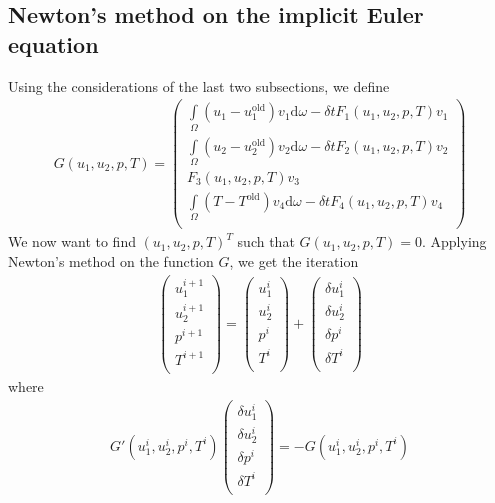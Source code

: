 \documentclass{article}
\begin{document}
 \subsection{Newton's method on the implicit Euler equation}
 Using the considerations of the last two subsections, we define
 \begin{align*}
 G(u_1,u_2,p,T) = 
 \begin{pmatrix}
\int\limits_\Omega (u_1- u_1^\text{old})v_1 \text{d}\omega -\delta t F_1(u_1,u_2,p,T)v_1\\
\int\limits_\Omega (u_2- u_2^\text{old})v_2 \text{d}\omega -\delta t F_2(u_1,u_2,p,T)v_2\\
F_3(u_1,u_2,p,T)v_3\\
\int\limits_\Omega (T- T^\text{old})v_4 \text{d}\omega -\delta t F_4(u_1,u_2,p,T)v_4\\
 \end{pmatrix}
 \end{align*}
 We now want to find $(u_1,u_2,p,T)^T$ such that $G(u_1,u_2,p,T) = 0$. Applying Newton's method on the function $G$, we get the iteration
 \begin{align*}
\begin{pmatrix}
u_1^{i+1}\\
u_2^{i+1}\\
p^{i+1}\\
T^{i+1}\\
\end{pmatrix}
=\begin{pmatrix}
u_1^{i}\\
u_2^{i}\\
p^{i}\\
T^{i}\\
\end{pmatrix}
+
\begin{pmatrix}
\delta u_1^{i}\\
\delta u_2^{i}\\
\delta p^{i}\\
\delta T^{i}\\
\end{pmatrix}
 \end{align*}
 where 
 \begin{align*}
G'(u_1^i,u_2^i,p^i,T^i)\begin{pmatrix}
\delta u_1^{i}\\
\delta u_2^{i}\\
\delta p^{i}\\
\delta T^{i}\\
\end{pmatrix} = -G(u_1^i,u_2^i,p^i,T^i)
 \end{align*}
\end{document}
